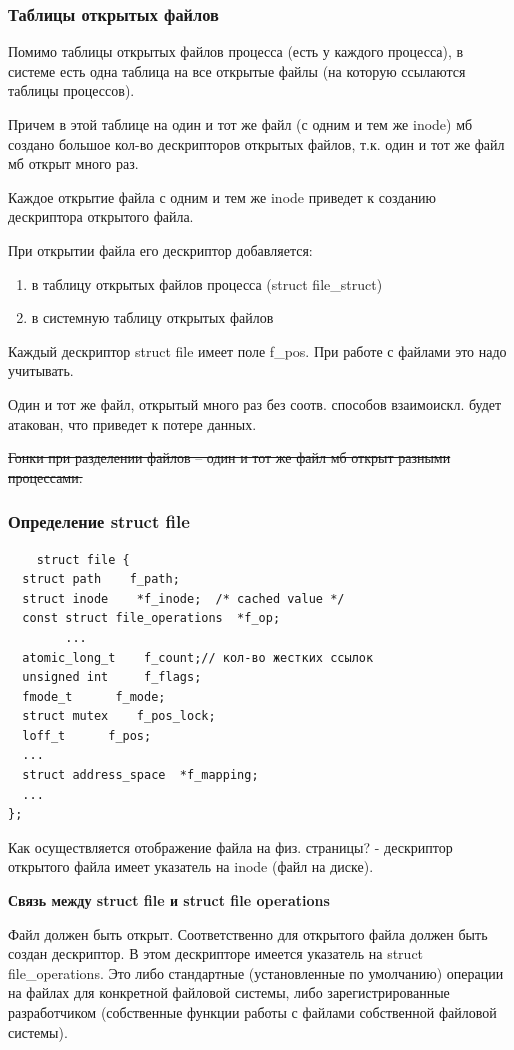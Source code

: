 \subsubsection{Таблицы открытых файлов}

Помимо таблицы открытых файлов процесса (есть у каждого процесса), в системе есть одна таблица на все открытые файлы (на которую ссылаются таблицы процессов).

Причем в этой таблице на один и тот же файл (с одним и тем же inode) мб создано большое кол-во дескрипторов открытых файлов, т.к. один и тот же файл мб открыт много раз. 

Каждое открытие файла с одним и тем же inode приведет к созданию дескриптора открытого файла.

При открытии файла его дескриптор добавляется:
\begin{enumerate}
    \item в таблицу открытых файлов процесса (struct file\_struct)
    \item в системную таблицу открытых файлов
\end{enumerate}

Каждый дескриптор struct file имеет поле f\_pos. При работе с файлами это надо учитывать.

Один и тот же файл, открытый много раз без соотв. способов взаимоискл. будет атакован, что приведет к потере данных.

\sout{Гонки при разделении файлов -- один и тот же файл мб открыт разными процессами.}

\subsubsection{Определение struct file}
\begin{lstlisting}
    struct file {
  struct path    f_path;
  struct inode    *f_inode;  /* cached value */
  const struct file_operations  *f_op;
        ...
  atomic_long_t    f_count;// кол-во жестких ссылок
  unsigned int     f_flags;
  fmode_t      f_mode;
  struct mutex    f_pos_lock;
  loff_t      f_pos;
  ...
  struct address_space  *f_mapping;
  ...
};
\end{lstlisting}
Как осуществляется отображение файла на физ. страницы? - дескриптор открытого файла имеет указатель на inode (файл на диске).

\textbf{Связь между struct file и struct file operations}

Файл должен быть открыт. Соответственно для открытого файла должен быть создан дескриптор. В этом дескрипторе имеется указатель на struct file\_operations. Это либо стандартные (установленные по умолчанию) операции на файлах для конкретной файловой системы, либо зарегистрированные разработчиком (собственные функции работы с файлами собственной файловой системы).

